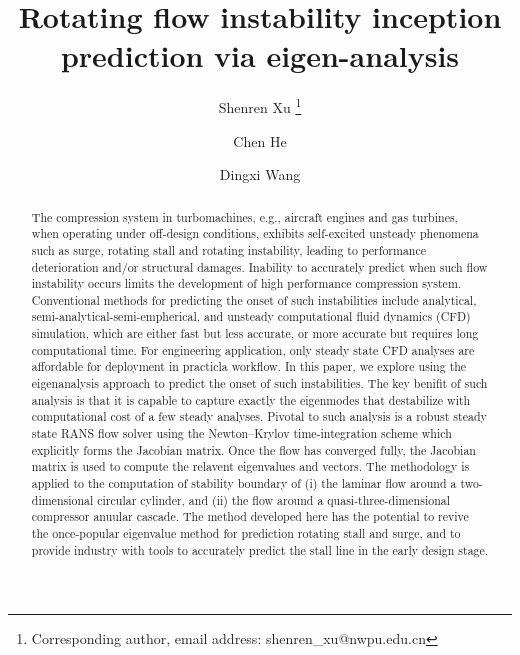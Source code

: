 \documentclass[journal,final]{new-aiaa}
\title{Rotating flow instability inception prediction via eigen-analysis}
\author[1]{Shenren Xu	
\footnote{ Corresponding author, email address: shenren\_xu@nwpu.edu.cn}}
\affil[1]{Northwestern Polytechnical University, Xi'an 710072, People’s Republic of China}
\affil[2]{Beihang University, Beijing 100191, People’s Republic of China}
\author[2]{Chen He}
\author[1]{Dingxi Wang}
\begin{document}
\maketitle

\begin{abstract}
The compression system in turbomachines, e.g.,  aircraft engines and gas turbines,
when operating under off-design conditions, exhibits self-excited unsteady phenomena
such as surge, rotating stall and rotating instability, leading to performance deterioration
and/or structural damages. Inability to accurately predict when such flow instability occurs
limits the development of high performance compression system.
Conventional methods for predicting the onset of such instabilities include analytical,
semi-analytical-semi-empherical, and unsteady computational fluid dynamics (CFD) simulation,
which are either fast but less accurate, or more accurate but requires long computational time.
For engineering application, only steady state CFD analyses are affordable for deployment
in practicla workflow. 
In this paper, we explore using the eigenanalysis approach to predict the onset of such
instabilities. The key benifit of such analysis is that it is capable to capture exactly the
eigenmodes that destabilize with computational cost of a few steady analyses.
Pivotal to such analysis is a robust steady state RANS flow solver using the Newton--Krylov
time-integration scheme which explicitly forms the Jacobian matrix. Once the flow has
converged fully, the Jacobian matrix is used to compute the relavent eigenvalues and vectors.
The methodology is applied to the computation of stability boundary of
(i) the laminar flow around a two-dimensional circular cylinder, and
(ii) the flow around a quasi-three-dimensional compressor anuular cascade.
The method developed here has the potential to revive the once-popular
eigenvalue method for prediction rotating stall and surge, and to provide
industry with tools to accurately predict the stall line in the early design stage.
\end{abstract}

%
\end{document}
